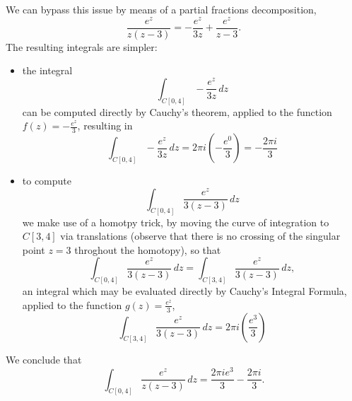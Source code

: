 \documentclass[12pt,oneside]{exam}
\begin{document}
We can bypass this issue by means of a partial fractions decomposition, 
\begin{equation*}
\frac{e^z}{z(z-3)} = -\frac{e^z}{3z} + \frac{e^{z}}{z-3}.
\end{equation*}
The resulting integrals are simpler:
\begin{itemize}
\item the integral 
\begin{equation*}
\int_{C[0,4]} -\frac{e^z}{3z}\, dz
\end{equation*}
can be computed directly by Cauchy's theorem, applied to the function $f(z)=-\frac{e^z}{3}$, resulting in 
\begin{equation*}
\int_{C[0,4]} -\frac{e^z}{3z}\, dz = 2\pi i \left(-\frac{e^0}{3}\right) = -\frac{2\pi i}{3}
\end{equation*}
\item to compute
\begin{equation*}
\int_{C[0,4]} \frac{e^{z}}{3(z-3)} \, dz
\end{equation*}
we make use of a homotpy trick, by moving the curve of integration to $C[3,4]$ via translations (observe that there is no crossing of the singular point $z=3$ throghout the homotopy), so that 
\begin{equation*}
\int_{C[0,4]} \frac{e^{z}}{3(z-3)} \, dz = \int_{C[3,4]} \frac{e^{z}}{3(z-3)} \, dz,
\end{equation*}
an integral which may be evaluated directly by Cauchy's Integral Formula, applied to the function $g(z)=\frac{e^z}{3}$,
\begin{equation*} 
\int_{C[3,4]} \frac{e^{z}}{3(z-3)} \, dz = 2\pi i\left( \frac{e^3}{3}\right)
\end{equation*}
\end{itemize}
We conclude that 
\begin{equation*}
\int_{C[0,4]} \frac{e^z}{z(z-3)}\, dz =\frac{ 2\pi ie^3}{3} -\frac{2\pi i}{3}.
\end{equation*}
\end{document}
